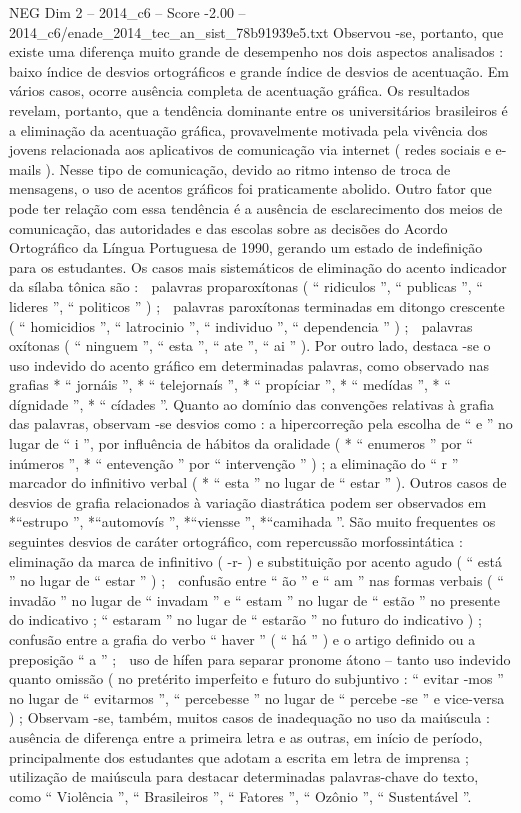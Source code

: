 \begin{textsample}{NEG Dim 2 – 2014\_c6 – Score -2.00 – 2014\_c6/enade\_2014\_tec\_an\_sist\_78b91939e5.txt}
Observou -se, portanto, que existe uma diferença muito grande de desempenho nos dois aspectos analisados : baixo índice de desvios ortográficos e grande índice de desvios de acentuação.
Em vários casos, ocorre ausência completa de acentuação gráfica.
Os resultados revelam, portanto, que a tendência dominante entre os universitários brasileiros é a eliminação da acentuação gráfica, provavelmente motivada pela vivência dos jovens relacionada aos aplicativos de comunicação via internet ( redes sociais e e-mails ).
Nesse tipo de comunicação, devido ao ritmo intenso de troca de mensagens, o uso de acentos gráficos foi praticamente abolido.
Outro fator que pode ter relação com essa tendência é a ausência de esclarecimento dos meios de comunicação, das autoridades e das escolas sobre as decisões do Acordo Ortográfico da Língua Portuguesa de 1990, gerando um estado de indefinição para os estudantes.
Os casos mais sistemáticos de eliminação do acento indicador da sílaba tônica são :  palavras proparoxítonas ( “ ridiculos ”, “ publicas ”, “ lideres ”, “ politicos ” ) ;  palavras paroxítonas terminadas em ditongo crescente ( “ homicidios ”, “ latrocinio ”, “ individuo ”, “ dependencia ” ) ;  palavras oxítonas ( “ ninguem ”, “ esta ”, “ ate ”, “ ai ” ).
Por outro lado, destaca -se o uso indevido do acento gráfico em determinadas palavras, como observado nas grafias * “ jornáis ”, * “ telejornaís ”, * “ propíciar ”, * “ medídas ”, * “ dígnidade ”, * “ cídades ”.
Quanto ao domínio das convenções relativas à grafia das palavras, observam -se desvios como : a hipercorreção pela escolha de “ e ” no lugar de “ i ”, por influência de hábitos da oralidade ( * “ enumeros ” por “ inúmeros ”, * “ entevenção ” por “ intervenção ” ) ; a eliminação do “ r ” marcador do infinitivo verbal ( * “ esta ” no lugar de “ estar ” ).
Outros casos de desvios de grafia relacionados à variação diastrática podem ser observados em *“estrupo ”, *“automovís ”, *“viensse ”, *“camihada ”.
São muito frequentes os seguintes desvios de caráter ortográfico, com repercussão morfossintática :  eliminação da marca de infinitivo ( -r- ) e substituição por acento agudo ( “ está ” no lugar de “ estar ” ) ;  confusão entre “ ão ” e “ am ” nas formas verbais ( “ invadão ” no lugar de “ invadam ” e “ estam ” no lugar de “ estão ” no presente do indicativo ; “ estaram ” no lugar de “ estarão ” no futuro do indicativo ) ;  confusão entre a grafia do verbo “ haver ” ( “ há ” ) e o artigo definido ou a preposição “ a ” ;  uso de hífen para separar pronome átono – tanto uso indevido quanto omissão ( no pretérito imperfeito e futuro do subjuntivo : “ evitar -mos ” no lugar de “ evitarmos ”, “ percebesse ” no lugar de “ percebe -se ” e vice-versa ) ; Observam -se, também, muitos casos de inadequação no uso da maiúscula : ausência de diferença entre a primeira letra e as outras, em início de período, principalmente dos estudantes que adotam a escrita em letra de imprensa ; utilização de maiúscula para destacar determinadas palavras-chave do texto, como “ Violência ”, “ Brasileiros ”, “ Fatores ”, “ Ozônio ”, “ Sustentável ”.

\end{textsample}
